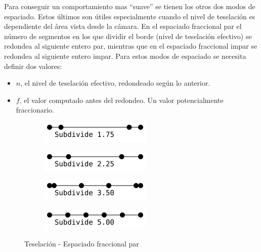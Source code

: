 Para conseguir un comportamiento mas ``suave'' se tienen los otros dos modos de
espaciado. Estos últimos son útiles especialmente cuando el nivel de teselación
es dependiente del área vista desde la cámara. En el espaciado fraccional par el
número de segmentos en los que dividir el borde (nivel de teselación efectivo)
se redondea al siguiente entero par, mientras que en el espaciado fraccional
impar se redondea al siguiente entero impar. Para estos modos de espaciado se
necesita definir dos valores:

\begin{itemize}
		\item $n$, el nivel de teselación efectivo, redondeado según lo
				anterior.
		\item $f$, el valor computado antes del redondeo. Un valor
				potencialmente fraccionario.
\end{itemize}

\begin{figure}
	\centering
	\begin{subfigure}{.45\textwidth}
			\includegraphics[width=\textwidth]{figures/even1.png}	
	\end{subfigure}
	\hfill
	\begin{subfigure}{.45\textwidth}
			\includegraphics[width=\textwidth]{figures/even2.png}	
	\end{subfigure}
	\newline
	\begin{subfigure}{.45\textwidth}
			\includegraphics[width=\textwidth]{figures/even3.png}	
	\end{subfigure}
	\hfill
	\begin{subfigure}{.45\textwidth}
			\includegraphics[width=\textwidth]{figures/even4.png}	
	\end{subfigure}
	\caption{Teselación - Espaciado fraccional par}
	\label{fig3.3}
\end{figure}

